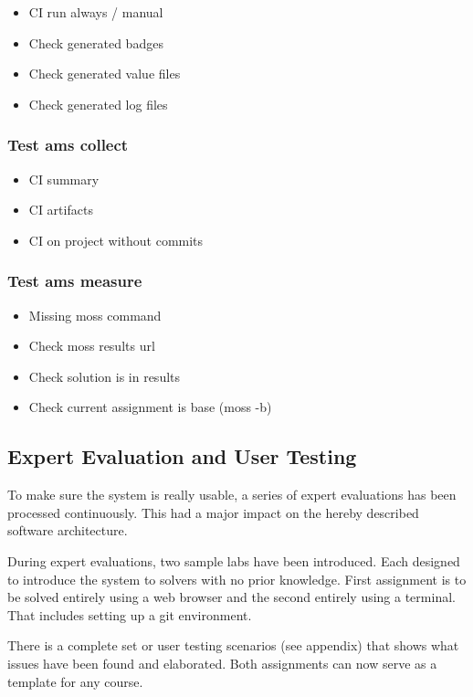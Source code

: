 \begin{itemize}
\item
  {CI run always / manual}
\item
  {Check generated badges}
\item
  {Check generated value files}
\item
  {Check generated log files}
\end{itemize}

\subsubsection{Test ams collect}

\begin{itemize}
\item
  {CI summary}
\item
  {CI artifacts}
\item
  {CI on project without commits}
\end{itemize}

\subsubsection{Test ams measure}

\begin{itemize}
\item
  {Missing moss command}
\item
  {Check moss results url}
\item
  {Check solution is in results}
\item
  {Check current assignment is base (moss -b)}
\end{itemize}

\subsection{Expert Evaluation and User Testing}\label{ssec:experteval}

{To make sure the system is really usable, a series of expert evaluations has been processed continuously. This had a major impact on the hereby described software architecture.}

{During expert evaluations, two sample labs have been introduced. Each designed to introduce the system to solvers with no prior knowledge. First assignment is to be solved entirely using a web browser and the second entirely using a terminal. That includes setting up a git environment.}

{There is a complete set or user testing scenarios (see appendix) that shows what issues have been found and elaborated. Both assignments can now serve as a template for any course.}
